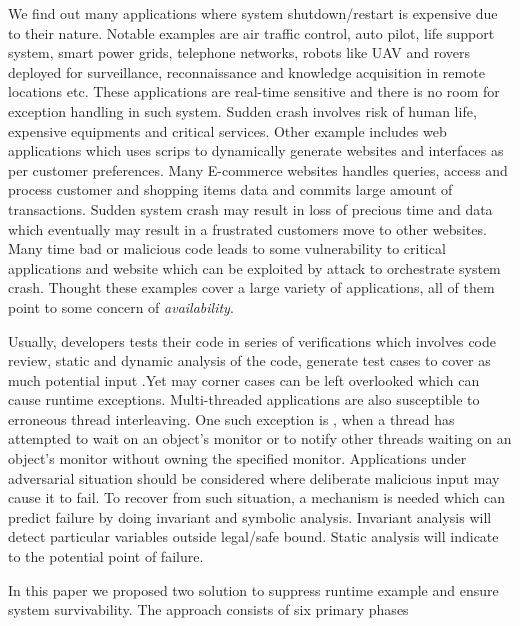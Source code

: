 We find out many applications where system shutdown/restart is expensive due to
their nature.
Notable examples are air traffic control, auto pilot, life support system, smart
power grids, telephone networks, robots like UAV and rovers deployed for
surveillance, reconnaissance and knowledge acquisition in remote locations etc.
These applications are real-time sensitive and there is no room for exception
handling in such system.
Sudden crash involves risk of human life, expensive equipments and critical
services.
Other example includes web applications which uses scrips to dynamically
generate websites and interfaces as per customer preferences.
Many E-commerce websites handles queries, access and process customer and
shopping items data and commits large amount of transactions.
Sudden system crash may result in loss of precious time and data which
eventually may result in a frustrated customers move to other websites.
Many time bad or malicious code leads to some vulnerability to critical
applications and website which can be exploited by attack to orchestrate system
crash. Thought these examples cover a large variety of applications, all of them
point to some concern of \emph{availability}.

Usually, developers tests their code in series of verifications which involves
code review, static and dynamic analysis of the code, generate test cases to
cover as much potential input .Yet may corner cases can be left overlooked which
can cause runtime exceptions.
Multi-threaded applications are also susceptible to erroneous thread
interleaving. One such exception is
, when a thread has attempted to
wait on an object's monitor or to notify other threads waiting on an object's
monitor without owning the specified monitor. Applications under adversarial
situation should be considered where deliberate malicious input may cause it to
fail. To recover from such situation, a mechanism is needed which can predict
failure by doing invariant and symbolic analysis. Invariant analysis will detect
particular variables outside legal/safe bound. Static analysis will indicate
to the potential point of failure.


In this paper we proposed two solution to suppress runtime example and ensure
system survivability. The approach consists of six primary phases

